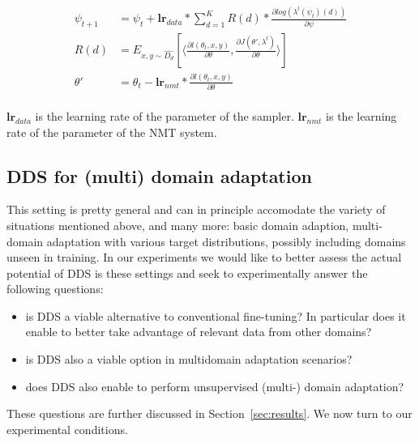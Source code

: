 \documentclass[11pt,a4paper]{article}
\newcommand{\fyTodo}[1]{\Todo[FY:]{\textcolor{orange}{#1}}}
\newcommand{\system}[1]{\texttt{{#1}}}
\begin{document}
\begin{align*}
\psi_{t+1} &= \psi_t + \mathbf{lr}_{data} * \displaystyle{\mathop{\sum}_{d=1}^K} R(d) * \frac{\partial log(\lambda^l(\psi_t)(d))}{\partial \psi} \\
  R(d) &= E_{x,y \sim \widehat{D_d}}[\langle \frac{\partial l(\theta_t,x,y)}{\partial \theta}, \frac{\partial J(\theta', \lambda^t)}{\partial \theta} \rangle] \\
  \theta' &= \theta_t - \mathbf{lr}_{nmt} * \frac{\partial l(\theta_t, x,y)}{\partial \theta} \\
\end{align*}

$\mathbf{lr}_{data}$ is the learning rate of the parameter of the sampler. $\mathbf{lr}_{nmt}$ is the learning rate of the parameter of the NMT system. \fyTodo{Explain lr, may be more}\fyTodo{More refs to the algorithm }
\subsection{DDS for (multi) domain adaptation}

This setting is pretty general and can in principle accomodate the variety of situations mentioned  above, and many more: basic domain adaption, multi-domain adaptation with various target distributions, possibly including domains unseen in training. In our experiments we would like to better assess the actual potential of DDS is these settings and seek to experimentally answer the following questions:
\begin{itemize}
\item is DDS a viable alternative to conventional fine-tuning? In particular does it enable to better take advantage of relevant data from other domains?
\item is DDS also a viable option in multidomain adaptation scenarios?
\item does DDS also enable to perform unsupervised (multi-) domain adaptation?\fyTodo{TBContinued}
\end{itemize}

These questions are further discussed in Section~\ref{sec:results}. We now turn to our experimental conditions.
\end{document}
